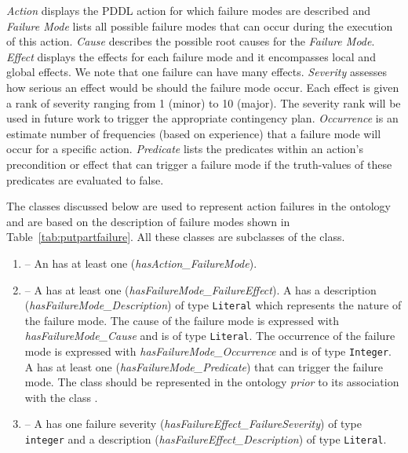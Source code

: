 \textit{Action} displays the PDDL action for which failure modes are described and \textit{Failure Mode} lists all possible failure modes that can
occur during the execution of this action. \textit{Cause} describes the possible root causes for the \textit{Failure Mode}. \textit{Effect}
displays the effects for each failure mode and it encompasses local and global effects. We note that one failure can have many effects. \textit{Severity} assesses how serious an effect would be should the failure mode occur. Each effect
is given a rank of severity ranging from 1 (minor) to 10 (major). The severity rank will be used in future work to trigger the appropriate contingency plan. \textit{Occurrence} is an estimate
number of frequencies (based on experience) that a failure mode will occur for a specific action. \textit{Predicate} lists the predicates within an action's precondition or effect
that can trigger a failure mode if the truth-values of these predicates are evaluated to false.




The classes discussed below are used to represent action failures in the 
ontology and are based on the description of failure modes shown in Table~\ref{tab:putpartfailure}. All these classes are subclasses of the  class.
\begin{enumerate}
\item {} -- An  has at least one 
(\emph{hasAction\_FailureMode}).
\item {} -- A  has at least one 
(\emph{hasFailureMode\_FailureEffect}). A  has a description
(\emph{hasFailureMode\_Description}) of type \texttt{Literal} which represents the
nature of the failure mode. The cause of the failure mode is expressed with
\emph{hasFailureMode\_Cause} and is of type \texttt{Literal}. The occurrence of
the failure mode is expressed with \emph{hasFailureMode\_Occurrence} and is of
type \texttt{Integer}. A  has at least one 
(\emph{hasFailureMode\_Predicate}) that can trigger the failure mode. The class  should be represented in the
ontology \textit{prior} to its association with the class .
\item {} -- A  has one failure severity
(\emph{hasFailureEffect\_FailureSeverity}) of type \texttt{integer} and a
description (\emph{hasFailureEffect\_Description}) of type \texttt{Literal}.
\end{enumerate}

